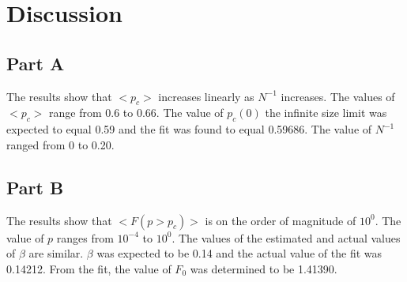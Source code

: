 \documentclass[12pt]{article}
\begin{document}
\section{Discussion}

\subsection{Part A}
\indent \indent The results show that $<p_c>$ increases linearly as $N^{-1}$ increases. The values of $<p_c>$ range from 0.6 to 0.66. The value of $p_c(0)$ the infinite size limit was expected to equal 0.59 and the fit was found to equal 0.59686. The value of $N^{-1}$ ranged from 0 to 0.20.

\subsection{Part B}
\indent \indent The results show that $<F(p>p_c)>$ is on the order of magnitude of $10^0$. The value of $p$ ranges from $10^{-4}$ to $10^0$. The values of the estimated and actual values of $\beta$ are similar. $\beta$ was expected to be 0.14 and the actual value of the fit was 0.14212. From the fit, the value of $F_0$ was determined to be 1.41390.
\end{document}
